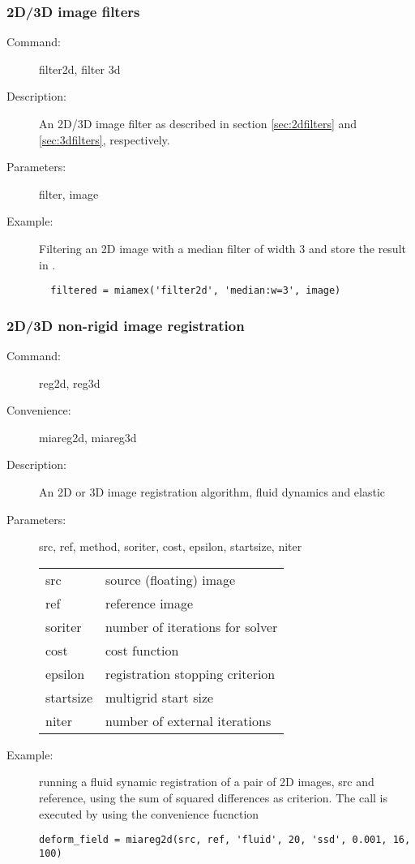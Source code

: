 \subsubsection*{2D/3D image filters}

\begin{description}
\item [Command:] filter2d, filter 3d
\item [Description:] An 2D/3D image filter as described in section \ref{sec:2dfilters} and \ref{sec:3dfilters}, respectively.
\item [Parameters:] filter, image
\item [Example:] Filtering an 2D image  with a median filter of width 3 and store the result in .
\begin{lstlisting}
  filtered = miamex('filter2d', 'median:w=3', image)
\end{lstlisting}
\end{description}

\subsubsection*{2D/3D non-rigid image registration}

\begin{description}
\item [Command:] reg2d, reg3d
\item [Convenience:] miareg2d, miareg3d
\item [Description:] An 2D or 3D image registration algorithm, fluid dynamics and elastic
\item [Parameters:] src, ref, method, soriter, cost, epsilon, startsize, niter

\begin{tabular}{ll}
src & source (floating) image \\
ref & reference image \\
soriter & number of iterations for solver \\
cost & cost function \\
epsilon & registration stopping criterion \\
startsize & multigrid start size \\
niter & number of external iterations  \\
\end{tabular}
\item [Example:] running a fluid synamic registration of a pair of 2D images, src and reference, using the sum of 
  squared differences as criterion. The call is executed by using the convenience fucnction
\begin{lstlisting}
deform_field = miareg2d(src, ref, 'fluid', 20, 'ssd', 0.001, 16, 100)
\end{lstlisting}
\end{description}

